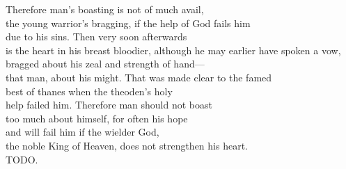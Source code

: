 \bvb Therefore man’s boasting is not of much avail, \\
the young warrior’s bragging, if the help of God fails him \\
due to his sins. Then very soon afterwards \\
is the heart in his breast bloodier, although he may earlier have spoken a vow, \\
bragged about his zeal and strength of hand--- \\
that man, about his might.  That was made clear to the famed \\
best of thanes when the theoden’s holy \\
help failed him.  Therefore man should not boast \\
too much about himself, for often his hope \\
and will fail him if the wielder God, \\
the noble King of Heaven, does not strengthen his heart. \\
TODO.\evb\evg

